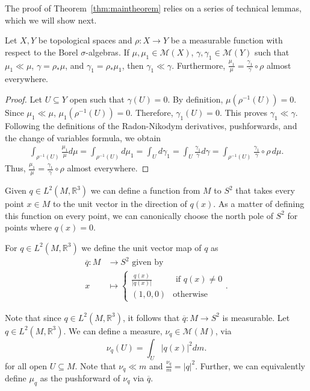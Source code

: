 \documentclass[final,hidelinks,onefignum,onetabnum]{siamart220329}
\newcommand{\R}{\mathbb{R}}
\begin{document}
The proof of Theorem~\ref{thm:maintheorem} relies on a series of technical lemmas, which we will show next.
\begin{lemma}\label{lem:pf-RN}
Let $X,Y$ be topological spaces and $\rho: X\to Y$ be a measurable function with respect to the Borel $\sigma$-algebras. If $\mu,\mu_1\in\mathcal{M}(X)$, $\gamma,\gamma_1\in \mathcal{M}(Y)$ such that $\mu_1\ll\mu$, $\gamma=\rho_*\mu$, and $\gamma_1=\rho_*\mu_1$, then $\gamma_1\ll\gamma$. Furthermore,
$\frac{\mu_1}{\mu}=\frac{\gamma_1}{\gamma}\circ\rho$  almost everywhere.
\end{lemma}
\begin{proof}
Let $U\subseteq Y$ open such that $\gamma(U)=0$. By definition, $\mu(\rho^{-1}(U))=0$. Since $\mu_1\ll\mu$, $\mu_1(\rho^{-1}(U))=0$. Therefore, $\gamma_1(U)=0$. This proves $\gamma_1\ll\gamma$.
\bigskip\\
Following the definitions of the Radon-Nikodym derivatives, pushforwards, and the change of variables formula, we obtain
\begin{align*}
    \int_{\rho^{-1}(U)}\frac{\mu_1}{\mu}d\mu=\int_{\rho^{-1}(U)}d\mu_1=\int_{U}d\gamma_1=\int_{U}\frac{\gamma_1}{\gamma}d\gamma=\int_{\rho^{-1}(U)}\frac{\gamma_1}{\gamma}\circ\rho \,d\mu.
\end{align*}
Thus, $\frac{\mu_1}{\mu}=\frac{\gamma_1}{\gamma}\circ\rho$  almost everywhere.
\end{proof}
Given  $q\in L^2(M,\R^3)$ we can define a function from $M$ to $S^2$ that takes every point $x\in M$ to the unit vector in the direction of $q(x)$. As a matter of defining this function on every point, we can canonically choose the north pole of $S^2$ for points where $q(x)=0$.
\begin{definition}
For $q\in L^2(M,\R^3)$ we define the unit vector map of $q$ as
\begin{align*}
\overline{q}:M&\to S^2 \text{ given by }\\
x&\mapsto \begin{cases}\frac{q(x)}{|q(x)|}& \text{ if } q(x)\neq 0\\(1,0,0)& \text{otherwise}\end{cases}.
\end{align*}
\end{definition}
Note that since $q\in L^2(M,\R^3)$, it follows that  $\overline{q}:M\to S^2$ is measurable.
Let $q\in L^2(M,\R^3)$. We can define a measure, $\nu_q\in \mathcal{M}(M)$, via  \[\nu_q(U)=\int_U |q(x)|^2 dm.\]
for all open $U\subseteq M$.
Note that $\nu_q\ll m$ and $\frac{\nu_q}{m}=|q|^2$. Further, we can equivalently define $\mu_q$ as the pushforward of $\nu_q$ via $\overline{q}$.
\end{document}
